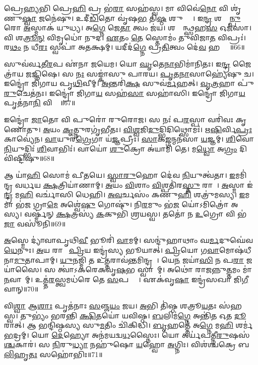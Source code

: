 𑌪𑍍𑌰𑍇\ul{𑌹𑍍𑌯}𑌭𑌿 𑌪𑍍𑌰𑍇\ul{𑌹𑌿} 𑌪𑍍𑌰 𑌭॑\ul{𑌰𑌾} 𑌸𑌹॑𑌸𑍍𑌵।
𑌮𑌾 𑌵𑌿𑌵𑍇॑\ul{𑌨𑍋} 𑌵𑌿 𑌶𑍃॑𑌣𑍁\ul{𑌷𑍍𑌵𑌾} 𑌜𑌨𑍇॑𑌷𑍁।
𑌉𑌦𑍀॑\ul{𑌡𑌿}𑌤𑍋 𑌵𑍃॑𑌷\ul{𑌭} 𑌤𑌿\ul{𑌷𑍍𑌠} 𑌶𑍁𑌷𑍍𑌮𑍈𑌃᳚।
𑌇\ul{𑌨𑍍𑌦𑍍𑌰} 𑌶𑌤𑍍𑌰𑍂᳚\ul{𑌨𑍍𑌪𑍁}𑌰𑍋 \ul{𑌅}𑌸𑍍𑌮𑌾𑌕॑ 𑌯𑍁𑌧𑍍𑌯।
𑌅\ul{𑌗𑍍𑌨𑍇} 𑌜𑍇\ul{𑌤𑌾} 𑌤𑍍𑌵𑌂 𑌜॑𑌯।
𑌶𑌤𑍍𑌰𑍂᳚𑌨𑍍𑌥𑍍𑌸𑌹\ul{𑌸} 𑌓𑌜॑𑌸𑌾।
𑌵𑌿 𑌶\ul{𑌤𑍍𑌰𑍂}\ul{𑌨𑍍} 𑌵𑌿𑌮𑍃𑌧𑍋॑ 𑌨𑍁𑌦।
\ul{𑌏}𑌤𑌂 \ul{𑌤𑍇} 𑌸𑍍𑌤𑍋𑌮𑌂॑ 𑌤𑍁𑌵𑌿𑌜𑌾\ul{𑌤} 𑌵𑌿𑌪𑍍𑌰𑌃॑।
𑌰\ul{𑌥𑌂} 𑌨 𑌧𑍀\ul{𑌰𑌃} 𑌸𑍍𑌵𑌪𑌾॑ 𑌅𑌤𑌕𑍍𑌷𑌮𑍍।
𑌯𑌦𑍀𑌦॑\ul{𑌗𑍍𑌨𑍇} 𑌪𑍍𑌰\ul{𑌤𑌿}𑌤𑍍𑌵𑌂 𑌦𑍇॑\ul{𑌵} 𑌹𑌰𑍍𑌯𑌾𑌃᳚॥66॥

𑌸𑍁𑌵॑𑌰𑍍𑌵𑌤𑍀\ul{𑌰}𑌪 𑌏॑𑌨𑌾 𑌜𑌯𑍇𑌮।
𑌯𑍋 \ul{𑌘𑍃}𑌤𑍇\ul{𑌨𑌾}𑌭𑌿𑌮𑌾॑𑌨𑌿𑌤𑌃।
𑌇\ul{𑌨𑍍𑌦𑍍𑌰} 𑌜𑍈𑌤𑍍𑌰𑌾॑𑌯 𑌜𑌜𑍍𑌞𑌿𑌷𑍇।
𑌸 \ul{𑌨𑌃} 𑌸𑌙𑍍𑌕𑌾॑𑌸𑍁 𑌪𑌾𑌰𑌯।
\ul{𑌪𑍃}\ul{𑌤}\ul{𑌨𑌾}𑌸𑌾𑌹𑍍𑌯𑍇॑𑌷𑍁 𑌚।
𑌇𑌨𑍍𑌦𑍍𑌰𑍋॑ 𑌜𑌿𑌗𑌾𑌯 𑌪𑍃\ul{𑌥𑌿}𑌵𑍀𑌮𑍍।
\ul{𑌅}𑌨𑍍𑌤𑌰𑌿॑\ul{𑌕𑍍𑌷}\ul{} 𑌸𑍁𑌵॑\ul{𑌰𑍍𑌮}𑌹𑌤𑍍।
\ul{𑌵𑍃}\ul{𑌤𑍍𑌰}𑌹𑌾 𑌪𑍁॑\ul{𑌰𑍁}𑌚𑍇𑌤॑𑌨𑌃।
𑌇𑌨𑍍𑌦𑍍𑌰𑍋॑ 𑌜𑌿𑌗𑌾\ul{𑌯} 𑌸𑌹॑\ul{𑌸𑌾} 𑌸𑌹𑌾॑𑌸𑌿।
𑌇𑌨𑍍𑌦𑍍𑌰𑍋॑ 𑌜𑌿𑌗𑌾\ul{𑌯} 𑌪𑍃𑌤॑𑌨𑌾\ul{𑌨𑌿} 𑌵𑌿𑌶𑍍𑌵𑌾᳚॥67॥

𑌇𑌨𑍍𑌦𑍍𑌰𑍋॑ \ul{𑌜𑌾}𑌤𑍋 𑌵𑌿 𑌪𑍁𑌰𑍋॑ 𑌰𑍁𑌰𑍋𑌜।
𑌸 𑌨𑌃॑ 𑌪\ul{𑌰}𑌸𑍍𑌪𑌾 𑌵𑌰𑌿॑𑌵𑌃 𑌕𑍃𑌣𑍋𑌤𑍁।
\ul{𑌅}𑌯𑌂 \ul{𑌕𑍃}𑌤𑍍𑌨𑍁𑌰𑌗𑍃॑𑌭𑍀𑌤𑌃।
\ul{𑌵𑌿}\ul{𑌶𑍍𑌵}𑌜𑌿\ul{𑌦𑍁}𑌦𑍍𑌭𑌿𑌦𑌿𑌥𑍍𑌸𑍋𑌮𑌃॑।
𑌋\ul{𑌷𑌿}𑌰𑍍𑌵𑌿\ul{𑌪𑍍𑌰𑌃} 𑌕𑌾𑌵𑍍𑌯𑍇॑𑌨।
\ul{𑌵𑌾}𑌯𑍁𑌰॑\ul{𑌗𑍍𑌰𑍇}𑌗𑌾 𑌯॑\ul{𑌜𑍍𑌞}𑌪𑍍𑌰𑍀𑌃।
\ul{𑌸𑌾}𑌕\ul{𑌙𑍍𑌗}𑌨𑍍𑌮𑌨॑𑌸𑌾 \ul{𑌯}𑌜𑍍𑌞𑌮𑍍।
\ul{𑌶𑌿}𑌵𑍋 \ul{𑌨𑌿}𑌯𑍁𑌦𑍍𑌭𑌿𑌃॑ \ul{𑌶𑌿}𑌵𑌾𑌭𑌿𑌃॑।
𑌵𑌾𑌯𑍋॑ \ul{𑌶𑍁}𑌕𑍍𑌰𑍋 𑌅॑𑌯𑌾𑌮𑌿 𑌤𑍇।
𑌮\ul{𑌧𑍍𑌵𑍋} 𑌅\ul{𑌗𑍍𑌰𑌂} 𑌦𑌿𑌵𑌿॑𑌷𑍍𑌟𑌿𑌷𑍁॥68॥

𑌆 𑌯𑌾॑\ul{𑌹𑌿} 𑌸𑍋𑌮॑ 𑌪𑍀𑌤𑌯𑍇।
\ul{𑌸𑍍𑌵𑌾}\ul{𑌰𑍁}𑌹𑍋 𑌦𑍇॑𑌵 \ul{𑌨𑌿}𑌯𑍁𑌤𑍍𑌵॑𑌤𑌾।
\ul{𑌇}𑌮𑌮𑌿॑𑌨𑍍𑌦𑍍𑌰 𑌵𑌰𑍍𑌧𑌯 \ul{𑌕𑍍𑌷}𑌤𑍍𑌰𑌿𑌯𑌾॑𑌣𑌾𑌮𑍍।
\ul{𑌅}𑌯𑌂 \ul{𑌵𑌿}𑌶𑌾𑌂 \ul{𑌵𑌿}𑌶𑍍𑌪𑌤𑌿॑𑌰\ul{𑌸𑍍𑌤𑍁} 𑌰𑌾𑌜𑌾᳚।
\ul{𑌅}𑌸𑍍𑌮𑌾 𑌇॑\ul{𑌨𑍍𑌦𑍍𑌰} 𑌮\ul{𑌹𑌿} 𑌵𑌰𑍍𑌚𑌾॑𑌸𑌿 𑌧𑍇𑌹𑌿।
\ul{𑌅}\ul{𑌵}𑌰𑍍𑌚𑌸𑌂॑ 𑌕𑌣𑍁\ul{𑌹𑌿} 𑌶𑌤𑍍𑌰𑍁॑𑌮𑌸𑍍𑌯।
\ul{𑌇}𑌮𑌮𑌾 𑌭॑\ul{𑌜} 𑌗𑍍𑌰𑌾\ul{𑌮𑍇} 𑌅𑌶𑍍𑌵𑍇॑\ul{𑌷𑍁} 𑌗𑍋𑌷𑍁॑।
𑌨𑌿\ul{𑌰}𑌮𑍁𑌂 𑌭॑\ul{𑌜} 𑌯𑍋॑\-𑌽𑌮𑌿𑌤𑍍𑌰𑍋॑ 𑌅𑌸𑍍𑌯।
𑌵𑌰𑍍𑌷𑍍𑌮॑𑌨𑍍 \ul{𑌕𑍍𑌷}𑌤𑍍𑌰𑌸𑍍𑌯॑ \ul{𑌕}𑌕𑍁𑌭𑌿॑ 𑌶𑍍𑌰𑌯𑌸𑍍𑌵।
𑌤𑌤𑍋॑ 𑌨 \ul{𑌉}𑌗𑍍𑌰𑍋 𑌵𑌿 𑌭॑\ul{𑌜𑌾} 𑌵𑌸𑍂॑𑌨𑌿॥69॥

\ul{𑌅}𑌸𑍍𑌮𑍇 𑌦𑍍𑌯𑌾॑𑌵𑌾𑌪𑍃𑌥𑌿\ul{𑌵𑍀} 𑌭𑍂𑌰𑌿॑ \ul{𑌵𑌾}𑌮𑌮𑍍।
𑌸𑌨𑍍𑌦𑍁॑𑌹𑌾𑌥𑌾𑌂 𑌘\ul{𑌰𑍍𑌮}𑌦𑍁𑌘𑍇॑𑌵 \ul{𑌧𑍇}𑌨𑍁𑌃।
\ul{𑌅}𑌯 𑌰𑌾𑌜𑌾᳚ \ul{𑌪𑍍𑌰𑌿}𑌯 𑌇𑌨𑍍𑌦𑍍𑌰॑𑌸𑍍𑌯 𑌭𑍂𑌯𑌾𑌤𑍍।
\ul{𑌪𑍍𑌰𑌿}𑌯𑍋 𑌗\ul{𑌵𑌾}𑌮𑍋𑌷॑𑌧𑍀𑌨𑌾\ul{𑌮𑍁}𑌤𑌾𑌪𑌾𑌮𑍍।
\ul{𑌯𑍁}𑌨𑌜𑍍𑌮𑌿॑ 𑌤 𑌉\ul{𑌤𑍍𑌤}𑌰𑌾𑌵॑\ul{𑌨𑍍𑌤}𑌮𑌿𑌨𑍍𑌦𑍍𑌰𑌮𑍍᳚।
𑌯𑍇\ul{𑌨} 𑌜𑌯𑌾॑\ul{𑌸𑌿} 𑌨 𑌪\ul{𑌰𑌾} 𑌜𑌯𑌾॑𑌸𑍈।
𑌸 𑌤𑍍𑌵𑌾॑\-𑌽𑌕𑌰𑍇𑌕𑌵𑍃\ul{𑌷}𑌭 𑌸𑍍𑌵𑌾𑌨𑌾᳚𑌮𑍍।
𑌅𑌥𑍋॑ 𑌰𑌾𑌜𑌨𑍍𑌨𑍁\ul{𑌤𑍍𑌤}𑌮𑌂 𑌮𑌾॑\ul{𑌨}𑌵𑌾𑌨𑌾᳚𑌮𑍍।
𑌉𑌤𑍍𑌤॑\ul{𑌰}𑌸𑍍𑌤𑍍𑌵𑌮𑌧॑𑌰𑍇 𑌤𑍇 \ul{𑌸}𑌪𑌤𑍍𑌨𑌾𑌃᳚।
𑌏𑌕॑𑌵𑍃\ul{𑌷𑌾} 𑌇𑌨𑍍𑌦𑍍𑌰॑𑌸𑌖𑌾 𑌜𑌿\ul{𑌗𑍀}𑌵𑌾𑌨𑍍॥70॥

𑌵𑌿\ul{𑌶𑍍𑌵𑌾} 𑌆\ul{𑌶𑌾𑌃} 𑌪𑍃𑌤॑𑌨𑌾𑌃 \ul{𑌸}𑌞𑍍𑌜\ul{𑌯𑌂} 𑌜𑌯\sn{}।
\ul{𑌅}𑌭𑌿 𑌤𑌿॑𑌷𑍍𑌠 𑌶𑌤𑍍𑌰𑍂\ul{𑌯}𑌤𑌃 𑌸॑𑌹𑌸𑍍𑌵।
𑌤𑍁𑌭𑍍𑌯𑌂॑ 𑌭𑌰𑌨𑍍𑌤𑌿 \ul{𑌕𑍍𑌷𑌿}𑌤𑌯𑍋॑ 𑌯𑌵𑌿𑌷𑍍𑌠।
\ul{𑌬}𑌲𑌿𑌮॑\ul{𑌗𑍍𑌨𑍇} 𑌅𑌨𑍍𑌤𑌿॑\ul{𑌤} 𑌓𑌤 \ul{𑌦𑍂}𑌰𑌾𑌤𑍍।
𑌆 𑌭𑌨𑍍𑌦𑌿॑𑌷𑍍𑌠𑌸𑍍𑌯 𑌸𑍁\ul{𑌮}𑌤𑌿𑌂 𑌚𑌿॑𑌕𑌿𑌦𑍍𑌧𑌿।
\ul{𑌬𑍃}𑌹𑌤𑍍𑌤𑍇॑ 𑌅\ul{𑌗𑍍𑌨𑍇} 𑌮\ul{𑌹𑌿} 𑌶𑌰𑍍𑌮॑ \ul{𑌭}𑌦𑍍𑌰𑌮𑍍।
𑌯𑍋 \ul{𑌦𑍇}𑌹𑍍𑌯𑍋 𑌅𑌨॑𑌮𑌯𑌦𑍍𑌵\ul{𑌧}𑌸𑍍𑌨𑍈𑌃।
𑌯𑍋 𑌅𑌰𑍍𑌯॑𑌪𑌤𑍍𑌨𑍀\ul{𑌰𑍁}𑌷𑌸॑\ul{𑌶𑍍𑌚}𑌕𑌾𑌰॑।
𑌸 \ul{𑌨𑌿}𑌰𑍁\ul{𑌧𑍍𑌯𑌾} 𑌨𑌹𑍁॑𑌷𑍋 \ul{𑌯}𑌹𑍍𑌵𑍋 \ul{𑌅}𑌗𑍍𑌨𑌿𑌃।
𑌵𑌿𑌶॑𑌶𑍍𑌚𑌕𑍍𑌰𑍇 𑌬\ul{𑌲𑌿}𑌹𑍃\ul{𑌤𑌃} 𑌸𑌹𑍋॑𑌭𑌿𑌃॥71॥

